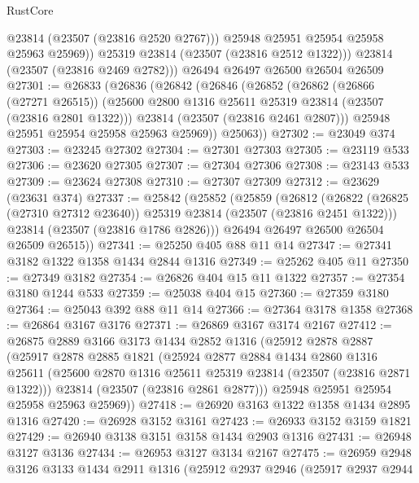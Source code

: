 \begin{lexlean}{RustCore}
\begin{coremodule}
              @23814
              (@23507 (@23816 @2520 @2767)))
            @25948
            @25951
            @25954
            @25958
            @25963
            @25969))
        @25319
        @23814
        (@23507 (@23816 @2512 @1322)))
      @23814
      (@23507 (@23816 @2469 @2782)))
    @26494
    @26497
    @26500
    @26504
    @26509
@27301 := @26833
    (@26836
      (@26842
        (@26846
          (@26852
            (@26862
              (@26866 (@27271 @26515))
              (@25600 @2800 @1316 @25611 @25319 @23814 (@23507 (@23816 @2801 @1322)))
              @23814
              (@23507 (@23816 @2461 @2807)))
            @25948
            @25951
            @25954
            @25958
            @25963
            @25969))
        @25063))
@27302 := @23049 @374
@27303 := @23245 @27302
@27304 := @27301 @27303
@27305 := @23119 @533
@27306 := @23620 @27305
@27307 := @27304 @27306
@27308 := @23143 @533
@27309 := @23624 @27308
@27310 := @27307 @27309
@27312 := @23629 (@23631 @374)
@27337 := @25842
    (@25852
      (@25859
        (@26812
          (@26822 (@26825 (@27310 @27312 @23640)) @25319 @23814 (@23507 (@23816 @2451 @1322)))
          @23814
          (@23507 (@23816 @1786 @2826)))
        @26494
        @26497
        @26500
        @26504
        @26509
        @26515))
@27341 := @25250 @405 @88 @11 @14
@27347 := @27341 @3182 @1322 @1358 @1434 @2844 @1316
@27349 := @25262 @405 @11
@27350 := @27349 @3182
@27354 := @26826 @404 @15 @11 @1322
@27357 := @27354 @3180 @1244 @533
@27359 := @25038 @404 @15
@27360 := @27359 @3180
@27364 := @25043 @392 @88 @11 @14
@27366 := @27364 @3178 @1358
@27368 := @26864 @3167 @3176
@27371 := @26869 @3167 @3174 @2167
@27412 := @26875
    @2889
    @3166
    @3173
    @1434
    @2852
    @1316
    (@25912
      @2878
      @2887
      (@25917
        @2878
        @2885
        @1821
        (@25924
          @2877
          @2884
          @1434
          @2860
          @1316
          @25611
          (@25600 @2870 @1316 @25611 @25319 @23814 (@23507 (@23816 @2871 @1322)))
          @23814
          (@23507 (@23816 @2861 @2877)))
        @25948
        @25951
        @25954
        @25958
        @25963
        @25969))
@27418 := @26920 @3163 @1322 @1358 @1434 @2895 @1316
@27420 := @26928 @3152 @3161
@27423 := @26933 @3152 @3159 @1821
@27429 := @26940 @3138 @3151 @3158 @1434 @2903 @1316
@27431 := @26948 @3127 @3136
@27434 := @26953 @3127 @3134 @2167
@27475 := @26959
    @2948
    @3126
    @3133
    @1434
    @2911
    @1316
    (@25912
      @2937
      @2946
      (@25917
        @2937
        @2944

\end{coremodule}
\end{lexlean}
